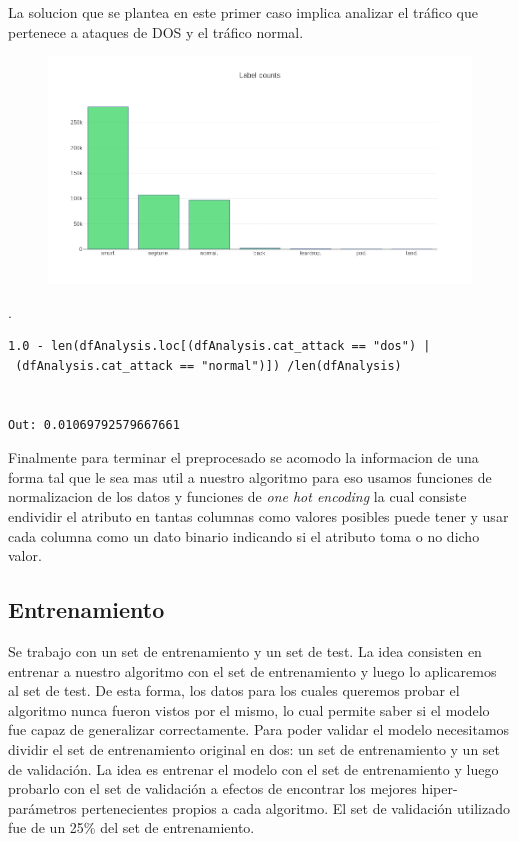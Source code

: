 \documentclass[a4paper,10pt]{article}
\begin{document}
La solucion que se plantea en este primer caso implica analizar  el tráfico que pertenece a ataques de DOS y el tráfico normal. 
\medskip
\begin{figure}[!htp]
\centering
\includegraphics[scale=0.5]{Wireshark/newplot(2).png} 
\caption{}
\end{figure}

.
\newpage
\lstset{language=Python}
\lstset{frame=lines}
\lstset{basicstyle=\footnotesize}
\begin{lstlisting}
1.0 - len(dfAnalysis.loc[(dfAnalysis.cat_attack == "dos") | 
 (dfAnalysis.cat_attack == "normal")]) /len(dfAnalysis)


Out: 0.01069792579667661
\end{lstlisting}

Finalmente para terminar el preprocesado se acomodo la informacion de una forma tal que le sea mas util a nuestro algoritmo para eso usamos funciones de normalizacion de los datos y funciones de \textit{one hot encoding} la cual consiste endividir el atributo en tantas columnas como valores posibles puede tener y usar cada columna como un dato binario indicando si el atributo toma o no dicho valor.

\subsection{Entrenamiento}
Se trabajo con un set de entrenamiento y un set de test. La
idea consisten en entrenar a nuestro algoritmo con el set de entrenamiento y
luego lo aplicaremos al set de test. De esta forma, los datos para los cuales
queremos probar el algoritmo nunca fueron vistos por el mismo, lo cual permite
saber si el modelo fue capaz de generalizar correctamente. Para poder validar
el modelo necesitamos dividir el set de entrenamiento original en dos: un set de
entrenamiento y un set de validación. La idea es entrenar el modelo con el set
de entrenamiento y luego probarlo con el set de validación a efectos de encontrar
los mejores hiper-parámetros pertenecientes propios a cada algoritmo. El set de validación utilizado fue de un 25\% del set de entrenamiento.\\
\end{document}
